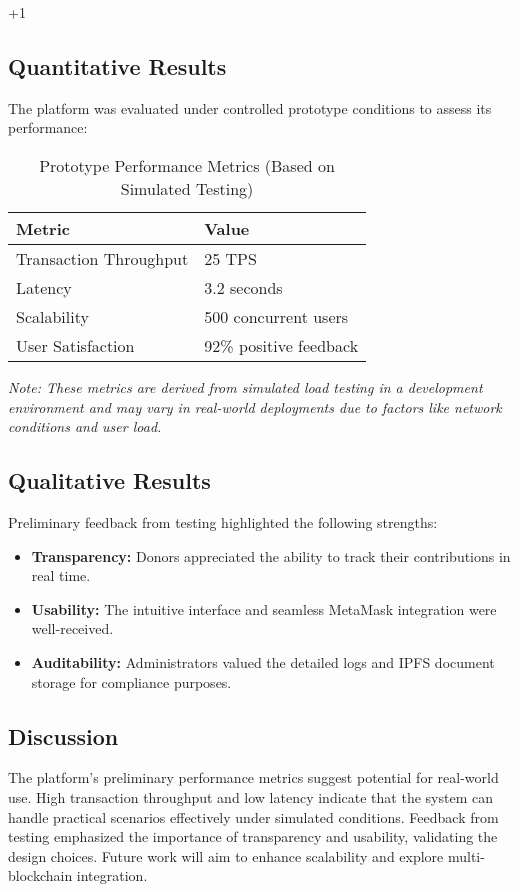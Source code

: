 +1\documentclass[conference]{IEEEtran}
\begin{document}
\subsection{Quantitative Results}
The platform was evaluated under controlled prototype conditions to assess its performance:
\begin{table}[ht]
\caption{Prototype Performance Metrics (Based on Simulated Testing)}
\centering
\begin{tabular}{|l|l|}
\hline
\textbf{Metric} & \textbf{Value} \\
\hline
Transaction Throughput & 25 TPS \\
Latency & 3.2 seconds \\
Scalability & 500 concurrent users \\
User Satisfaction & 92\% positive feedback \\
\hline
\end{tabular}
\label{tab:performance}
\end{table}
\textit{Note: These metrics are derived from simulated load testing in a development environment and may vary in real-world deployments due to factors like network conditions and user load.}

\subsection{Qualitative Results}
Preliminary feedback from testing highlighted the following strengths:
\begin{itemize}
    \item \textbf{Transparency:} Donors appreciated the ability to track their contributions in real time.
    \item \textbf{Usability:} The intuitive interface and seamless MetaMask integration were well-received.
    \item \textbf{Auditability:} Administrators valued the detailed logs and IPFS document storage for compliance purposes.
\end{itemize}

\subsection{Discussion}
The platform’s preliminary performance metrics suggest potential for real-world use. High transaction throughput and low latency indicate that the system can handle practical scenarios effectively under simulated conditions. Feedback from testing emphasized the importance of transparency and usability, validating the design choices. Future work will aim to enhance scalability and explore multi-blockchain integration.
\end{document}
